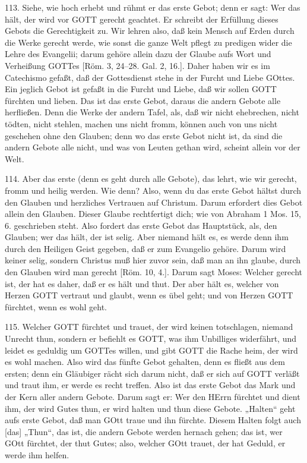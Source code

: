 113. Siehe, wie hoch erhebt und rühmt er das erste Gebot; denn er sagt: Wer das hält, der wird vor GOTT gerecht geachtet. Er schreibt der Erfüllung dieses Gebots die Gerechtigkeit zu. Wir lehren also, daß kein Mensch auf Erden durch die Werke gerecht werde, wie sonst die ganze Welt pflegt zu predigen wider die Lehre des Evangelii; darum gehöre allein dazu der Glaube aufs Wort und Verheißung GOTTes [Röm. 3, 24–28. Gal. 2, 16.]. Daher haben wir es im Catechismo gefaßt, daß der Gottesdienst stehe in der Furcht und Liebe GOttes. Ein jeglich Gebot ist gefaßt in die Furcht und Liebe, daß wir sollen GOTT fürchten und lieben. Das ist das erste Gebot, daraus die andern Gebote alle herfließen. Denn die Werke der andern Tafel, als, daß wir nicht ehebrechen, nicht tödten, nicht stehlen, machen uns nicht fromm, können auch von uns nicht geschehen ohne den Glauben; denn wo das erste Gebot nicht ist, da sind die andern Gebote alle nicht, und was von Leuten gethan wird, scheint allein vor der Welt.

114. Aber das erste (denn es geht durch alle Gebote), das lehrt, wie wir gerecht, fromm und heilig werden. Wie denn? Also, wenn du das erste Gebot hältst durch den Glauben und herzliches Vertrauen auf Christum. Darum erfordert dies Gebot allein den Glauben. Dieser Glaube rechtfertigt dich; wie von Abraham 1 Mos. 15, 6. geschrieben steht. Also fordert das erste Gebot das Hauptstück, als, den Glauben; wer das hält, der ist selig. Aber niemand hält es, es werde denn ihm durch den Heiligen Geist gegeben, daß er zum Evangelio gehöre. Darum wird keiner selig, sondern Christus muß hier zuvor sein, daß man an ihn glaube, durch den Glauben wird man gerecht [Röm. 10, 4.]. Darum sagt Moses: Welcher gerecht ist, der hat es daher, daß er es hält und thut. Der aber hält es, welcher von Herzen GOTT vertraut und glaubt, wenn es übel geht; und von Herzen GOTT fürchtet, wenn es wohl geht.

115. Welcher GOTT fürchtet und trauet, der wird keinen totschlagen, niemand Unrecht thun, sondern er befiehlt es GOTT, was ihm Unbilliges widerfährt, und leidet es geduldig um GOTTes willen, und gibt GOTT die Rache heim, der wird es wohl machen. Also wird das fünfte Gebot gehalten, denn es fließt aus dem ersten; denn ein Gläubiger rächt sich darum nicht, daß er sich auf GOTT verläßt und traut ihm, er werde es recht treffen. Also ist das erste Gebot das Mark und der Kern aller andern Gebote. Darum sagt er: Wer den HErrn fürchtet und dient ihm,
der wird Gutes thun, er wird halten und thun diese Gebote. „Halten“ geht aufs erste Gebot, daß man GOtt traue und ihn fürchte. Diesem Halten folgt auch [das] „Thun“, das ist, die andern Gebote werden hernach gehen; das ist, wer GOtt fürchtet, der thut Gutes; also, welcher GOtt trauet, der hat Geduld, er werde ihm helfen.


